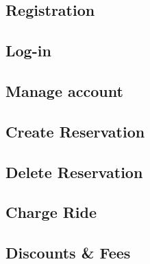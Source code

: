\newpage
\subsection{Registration}
  

\newpage
\subsection{Log-in}
  

\newpage
\subsection{Manage account}
  

\newpage
\subsection{Create Reservation}
  
  
%  
  
\newpage
\subsection{Delete Reservation}
  

\newpage
\subsection{Charge Ride}
   

\newpage
\subsection{Discounts \& Fees}
   


